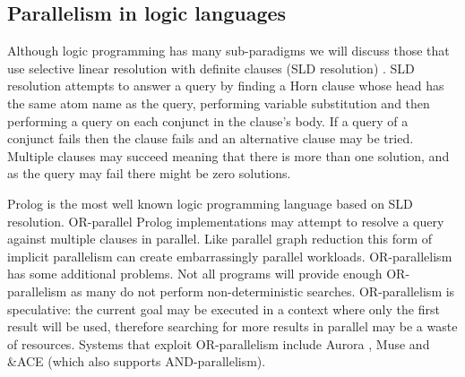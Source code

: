 \subsection{Parallelism in logic languages}
\label{sec:intro_par_logic}

Although logic programming has many sub-paradigms we will discuss
those that use selective linear resolution with definite clauses
(SLD resolution) \citep{kowalski_sld}.
SLD resolution attempts to answer a query by finding a Horn clause whose
head has the same atom name as the query,
performing variable substitution and then performing a query on each
conjunct in the clause's body.
If a query of a conjunct fails then the clause fails and an alternative
clause may be tried.
Multiple clauses may succeed meaning that there is more than one solution,
and as the query may fail there might be zero solutions.

Prolog is the most well known logic programming language based on SLD
resolution.
OR-parallel Prolog implementations may attempt to resolve a query against
multiple clauses in parallel.
Like parallel graph reduction this form of implicit parallelism can create
embarrassingly parallel workloads.
OR-parallelism has some additional problems.
Not all programs will provide enough OR-parallelism as many do not perform
non-deterministic searches.
OR-parallelism is speculative:
the current goal may be executed in a context where only the first result
will be used,
therefore searching for more results in parallel may be a waste of
resources.
Systems that exploit OR-parallelism include
Aurora \citep*{lusk:1990:aurora},
Muse \citep*{ali:1990:muse}
and \&ACE \citep*{gupta:1991:ace} (which also supports AND-parallelism).

